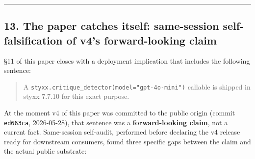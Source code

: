 \documentclass[
]{article}
\begin{document}
\begin{center}\rule{0.5\linewidth}{0.5pt}\end{center}

\subsection{13. The paper catches itself: same-session
self-falsification of v4's forward-looking
claim}\label{the-paper-catches-itself-same-session-self-falsification-of-v4s-forward-looking-claim}

§11 of this paper closes with a deployment implication that includes the
following sentence:

\begin{quote}
A \texttt{styxx.critique\_detector(model="gpt-4o-mini")} callable is
shipped in styxx 7.7.10 for this exact purpose.
\end{quote}

At the moment v4 of this paper was committed to the public origin
(commit \texttt{ed663ca}, 2026-05-28), that sentence was a
\textbf{forward-looking claim}, not a current fact. Same-session
self-audit, performed before declaring the v4 release ready for
downstream consumers, found three specific gaps between the claim and
the actual public substrate:
\end{document}
